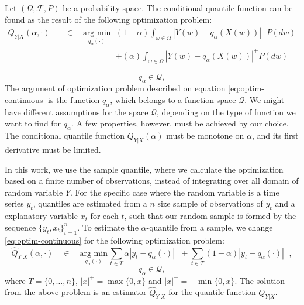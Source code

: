 Let $(\Omega, \mathcal{F}, P)$ be a probability space. The conditional quantile function can be found as the result of the following optimization problem:
\begin{eqnarray}
Q_{Y|X}(\alpha, \cdot)\quad & \in\quad\underset{q_\alpha(\cdot)}{\text{arg min}}\, &
(1-\alpha)\int_{\omega \in \Omega}|Y(w)-q_\alpha(X(w))|^{-}P(dw) \label{eq:optim-continuous}
 \\ & & + (\alpha)\int_{\omega \in \Omega}|Y(w)-q_\alpha(X(w))|^{+}P(dw) \nonumber
\end{eqnarray}

\begin{equation}
  q_\alpha  \in \mathcal{Q},
\end{equation}
 The argument of optimization problem described on equation \ref{eq:optim-continuous} is the function $q_\alpha$, which belongs to a function space $\mathcal{Q}$. We might have different assumptions for the space $\mathcal{Q}$, depending on the type of function we want to find for $q_\alpha$. A few properties, however, must be achieved by our choice. The conditional quantile function $Q_{Y|X}(\alpha)$ must be monotone on $\alpha$, and its first derivative must be limited.

In this work, we use the sample quantile,  where we calculate the optimization based on a finite number of observations, instead of integrating over all domain of random variable $Y$. For the specific case where the random variable is a time series $y_t$, quantiles are estimated from a $n$ size sample of observations of $y_t$ and a explanatory variable $x_t$ for each $t$, such that our random sample is formed by the sequence $\{y_t,x_t \}_{t=1}^n$. To estimate the $\alpha$-quantile from a sample, we change \ref{eq:optim-continuous} for the following optimization problem:
\begin{equation}
\hat{Q}_{Y|X}(\alpha, \cdot)\quad \in\quad\underset{q_\alpha(\cdot)}{\text{arg min}}\,\sum_{t \in T}\alpha|y_{t}-q_\alpha(\cdot)|^{+}+\sum_{t \in T}(1-\alpha)|y_{t}-q_\alpha(\cdot)|^{-},
\label{eq:linear-model}
\end{equation}
\begin{equation}
  q_\alpha  \in \mathcal{Q},
\end{equation}
where $T = \{0, \dots, n \}$, $|x|^+=\max\{0,x\}$ and $|x|^-=-\min\{0,x\}$. The solution from the above problem is an estimator $\hat{Q}_{Y|X}$ for the quantile function $Q_{Y|X}$.

